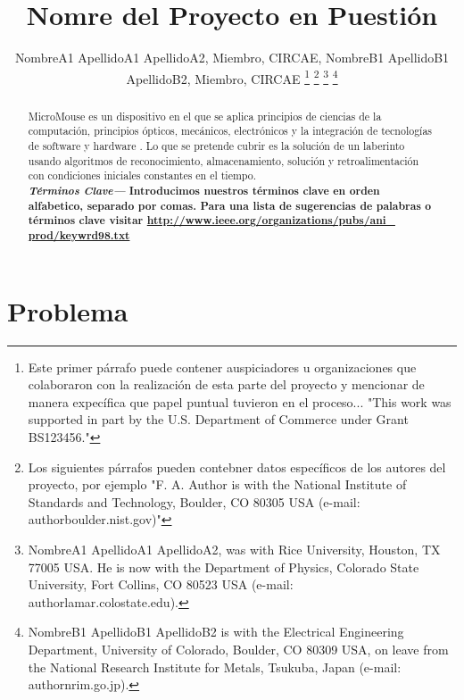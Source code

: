 \documentclass[a4paper]{IEEEtran} %
\providecommand{\keywords}[1]{\textbf{\textit{Términos Clave---}} #1}
\begin{document}
\title{Nomre del Proyecto en Puestión}
\author{NombreA1 ApellidoA1 ApellidoA2, Miembro, CIRCAE, NombreB1 ApellidoB1 ApellidoB2, Miembro, CIRCAE
\thanks{Este primer párrafo puede contener auspiciadores u organizaciones que colaboraron con la realización de esta parte del proyecto y mencionar de manera expecífica que papel puntual tuvieron en el proceso... "This work was supported in part by the U.S. Department of Commerce under Grant BS123456."}
\thanks{Los siguientes párrafos pueden contebner datos específicos de los autores del proyecto, por ejemplo "F. A. Author is with the National Institute of Standards and Technology, Boulder, CO 80305 USA (e-mail: author\@ boulder.nist.gov)"}
\thanks{NombreA1 ApellidoA1 ApellidoA2, was with Rice University, Houston, TX 77005 USA. He is now with the Department of Physics, Colorado State University, Fort Collins, CO 80523 USA (e-mail: author\@ lamar.colostate.edu).}
\thanks{NombreB1 ApellidoB1 ApellidoB2 is with the Electrical Engineering Department, University of Colorado, Boulder, CO 80309 USA, on leave from the National Research Institute for Metals, Tsukuba, Japan (e-mail: author\@ nrim.go.jp).}}

\maketitle


\begin{abstract}
MicroMouse es un dispositivo en el que se aplica principios de ciencias de la computación, principios ópticos, mecánicos, electrónicos y la integración de tecnologías de software y hardware \cite{libro1} . Lo que se pretende cubrir es la solución de un laberinto usando algoritmos de reconocimiento, almacenamiento, solución y retroalimentación con condiciones iniciales constantes en el tiempo.\\
\keywords{\textbf{Introducimos nuestros términos clave en orden alfabetico, separado por comas. Para una lista de sugerencias de palabras o términos clave visitar \underline{http://www.ieee.org/organizations/pubs/ani\_ prod/keywrd98.txt}}}
\end{abstract}




\section{Problema}
    
\end{document}

